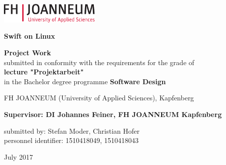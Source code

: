 \chapterend

\begin{titlepage}

\begin{center}
\includegraphics[height=1cm]{images/logo_FHJ_100mm_cmyk}
\hfill

\mbox{}\vfill

  \large

  {\huge\bf Swift on Linux}

  \vspace{2.0cm}

  {\bf Project Work}\\
submitted in conformity with the requirements for the grade of\\
{\bf lecture "Projektarbeit"}\\
in the Bachelor degree programme {\bf Software Design\\}

  \vspace{0.5cm}

 FH JOANNEUM  (University of Applied Sciences), Kapfenberg

  \vspace{1.5cm}

  \mbox{}

  {\bf Supervisor: DI Johannes Feiner, FH JOANNEUM Kapfenberg

  submitted by: Stefan Moder, Christian Hofer\\
  personnel identifier: 1510418049, 1510418043}

  \vspace{1.5cm}

   July 2017

\end{center}
\vfill\mbox{}


\end{titlepage}



\chapterend

